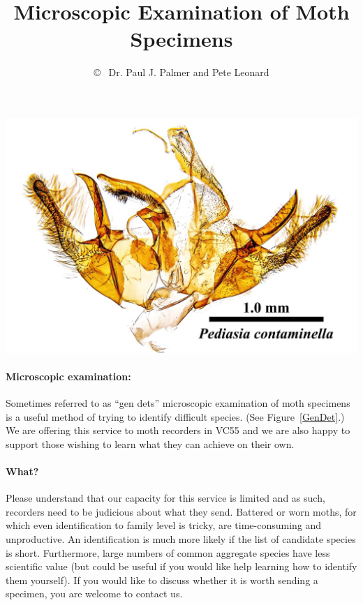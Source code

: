 \documentclass[12pt]{article}
\title{Microscopic Examination of Moth Specimens}
\author{  \copyright ~  {Dr. Paul J. Palmer} and {Pete Leonard}}
\begin{document}
{}
%



	\begin{center}
	\centering
	\includegraphics[width=0.6\linewidth]{images/dissection}\hfill

	\label{GenDet}
\end{center}


\paragraph{Microscopic examination:}Sometimes referred to as \enquote{gen dets} microscopic examination of moth specimens is a useful method of trying to identify difficult species. (See Figure~\ref{GenDet}.) We are offering this service to moth recorders in VC55 and we are also happy to support those wishing to learn what they can achieve on their own.   


\paragraph{What?} Please understand that our capacity for this service is limited and as such, recorders need to be judicious about what they send. Battered or worn moths, for which even identification to family level is tricky, are time-consuming and unproductive. An identification is much more likely if the list of candidate species is short. Furthermore, large numbers of common aggregate species have less scientific value (but could be useful if you would like help learning how to identify them yourself). If you would like to discuss whether it is worth sending a specimen, you are welcome to contact us.  
\end{document}
